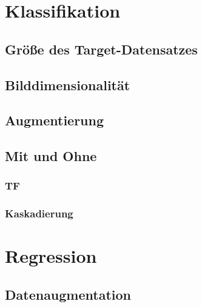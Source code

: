 \documentclass[ngerman]{report}
\begin{document}
    \chapter{Klassifikation}  %
    
    \section{Größe des Target-Datensatzes}
    
    \section{Bilddimensionalität}
    
    \section{Augmentierung}
    
    \section{Mit und Ohne}
    \subsection{TF}
    
    \subsection{Kaskadierung}
    


    \chapter{Regression}  %
    
    \section{Datenaugmentation}
    
\end{document}
